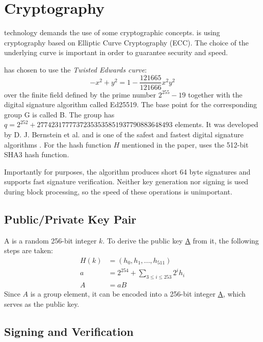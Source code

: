 \section{Cryptography}
\label{sec:cryptography}


 technology demands the use of some cryptographic concepts.
\codenamespace is using cryptography based on Elliptic Curve Cryptography (ECC).
The choice of the underlying curve is important in order to guarantee security and speed.

\codenamespace has chosen to use the \emph{Twisted Edwards curve}:
$$ -x^2 + y^2 = 1 - \frac{121665}{121666} x^2 y^2$$
over the finite field defined by the prime number $2^{255}-19$ together with the digital signature algorithm called Ed25519.
The base point for the corresponding group G is called B. The group has $q=2^{252} + 27742317777372353535851937790883648493$ elements.
It was developed by D. J. Bernstein et al. and is one of the safest and fastest digital signature algorithms \cite{Bernstein2011}.
For the hash function $H$ mentioned in the paper, \codenamespace uses the 512-bit SHA3 hash function.

Importantly for \codenamespace purposes, the algorithm produces short 64 byte signatures and supports fast signature verification.
Neither key generation nor signing is used during block processing, so the speed of these operations is unimportant.

\subsection{Public/Private Key Pair}

A  is a random 256-bit integer $k$. To derive the public key \underline{A} from it, the following steps are taken:
\begin{align}
H(k) &=(h_0, h_1,..., h_{511}) \\
a &= 2^{254} + \sum_{3\leq i \leq 253} 2^i h_i \\
A &= aB
\end{align}
Since $A$ is a group element, it can be encoded into a 256-bit integer \underline{A}, which serves as the public key.

\subsection{Signing and Verification}

